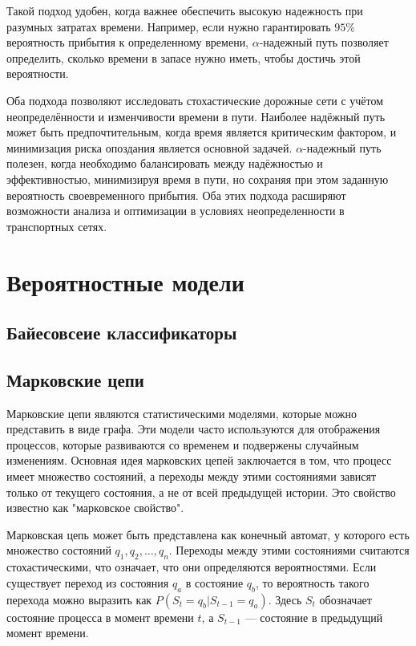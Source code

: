 Такой подход удобен, когда важнее обеспечить высокую надежность при разумных затратах времени. Например, если нужно гарантировать $95\%$ вероятность прибытия к определенному времени, $\alpha$-надежный путь позволяет определить, сколько времени в запасе нужно иметь, чтобы достичь этой вероятности.

Оба подхода позволяют исследовать стохастические дорожные сети с учётом неопределённости и изменчивости времени в пути. Наиболее надёжный путь может быть предпочтительным, когда время является критическим фактором, и минимизация риска опоздания является основной задачей. $\alpha$-надежный путь полезен, когда необходимо балансировать между надёжностью и эффективностью, минимизируя время в пути, но сохраняя при этом заданную вероятность своевременного прибытия. Оба этих подхода расширяют возможности анализа и оптимизации в условиях неопределенности в транспортных сетях.



\section{Вероятностные модели}



\subsection{Байесовсеие классификаторы}

\subsection{Марковские цепи}


Марковские цепи являются статистическими моделями, которые можно представить в виде графа. Эти модели часто используются для отображения процессов, которые развиваются со временем и подвержены случайным изменениям. Основная идея марковских цепей заключается в том, что процесс имеет множество состояний, а переходы между этими состояниями зависят только от текущего состояния, а не от всей предыдущей истории. Это свойство известно как "марковское свойство".

Марковская цепь может быть представлена как конечный автомат, у которого есть множество состояний $q_1, q_2, \ldots, q_n$. Переходы между этими состояниями считаются стохастическими, что означает, что они определяются вероятностями. Если существует переход из состояния $q_a$ в состояние $q_b$, то вероятность такого перехода можно выразить как $P(S_t = q_b | S_{t - 1} = q_a)$. Здесь $S_t$ обозначает состояние процесса в момент времени $t$, а $S_{t - 1}$ — состояние в предыдущий момент времени.

